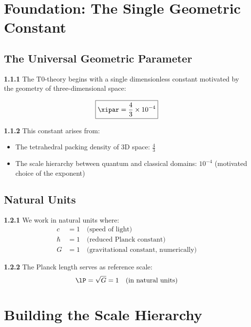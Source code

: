 	\section{Foundation: The Single Geometric Constant}
	
	\subsection{The Universal Geometric Parameter}
	
	\noindent \textbf{1.1.1} The T0-theory begins with a single dimensionless constant motivated by the geometry of three-dimensional space:
	
	\begin{keyresult}
		\begin{equation}
			\boxed{\xipar = \frac{4}{3} \times 10^{-4}}
		\end{equation}
	\end{keyresult}
	
	\noindent \textbf{1.1.2} This constant arises from:
	\begin{itemize}
		\item The tetrahedral packing density of 3D space: $\frac{4}{3}$
		\item The scale hierarchy between quantum and classical domains: $10^{-4}$ (motivated choice of the exponent)
	\end{itemize}
	
	\subsection{Natural Units}
	
	\noindent \textbf{1.2.1} We work in natural units where:
	\begin{align}
		c &= 1 \quad \text{(speed of light)} \\
		\hbar &= 1 \quad \text{(reduced Planck constant)} \\
		G &= 1 \quad \text{(gravitational constant, numerically)}
	\end{align}
	
	\noindent \textbf{1.2.2} The Planck length serves as reference scale:
	\begin{equation}
		\lP = \sqrt{G} = 1 \quad \text{(in natural units)}
	\end{equation}
	
	\section{Building the Scale Hierarchy}
	
